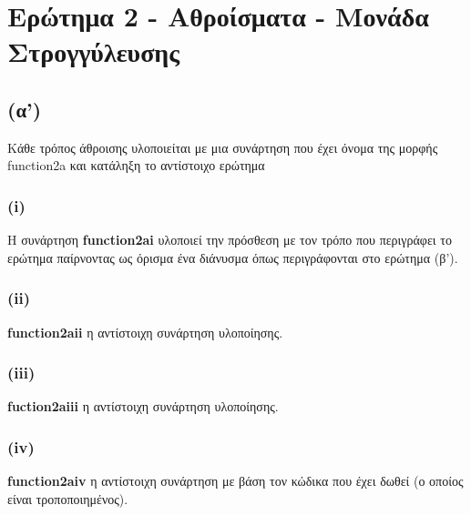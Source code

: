 \documentclass{article}
\begin{document}
\section*{Ερώτημα 2 - Αθροίσματα - Μονάδα Στρογγύλευσης}
\subsection*{(α')}
Κάθε τρόπος άθροισης υλοποιείται με μια συνάρτηση που έχει όνομα της μορφής function2a και κατάληξη το αντίστοιχο ερώτημα
\subsubsection*{(i)}
Η συνάρτηση  \textbf{function2ai}  υλοποιεί την πρόσθεση με τον τρόπο που περιγράφει το ερώτημα παίρνοντας ως όρισμα ένα διάνυσμα όπως περιγράφονται στο ερώτημα (β').
\subsubsection*{(ii)}
 \textbf{function2aii}  η αντίστοιχη συνάρτηση υλοποίησης.
\subsubsection*{(iii)}\textbf{fuction2aiii}  η αντίστοιχη συνάρτηση υλοποίησης.
\subsubsection*{(iv)}\textbf{function2aiv}  η αντίστοιχη συνάρτηση με βάση τον κώδικα που έχει δωθεί (ο οποίος είναι τροποποιημένος).
\end{document}
